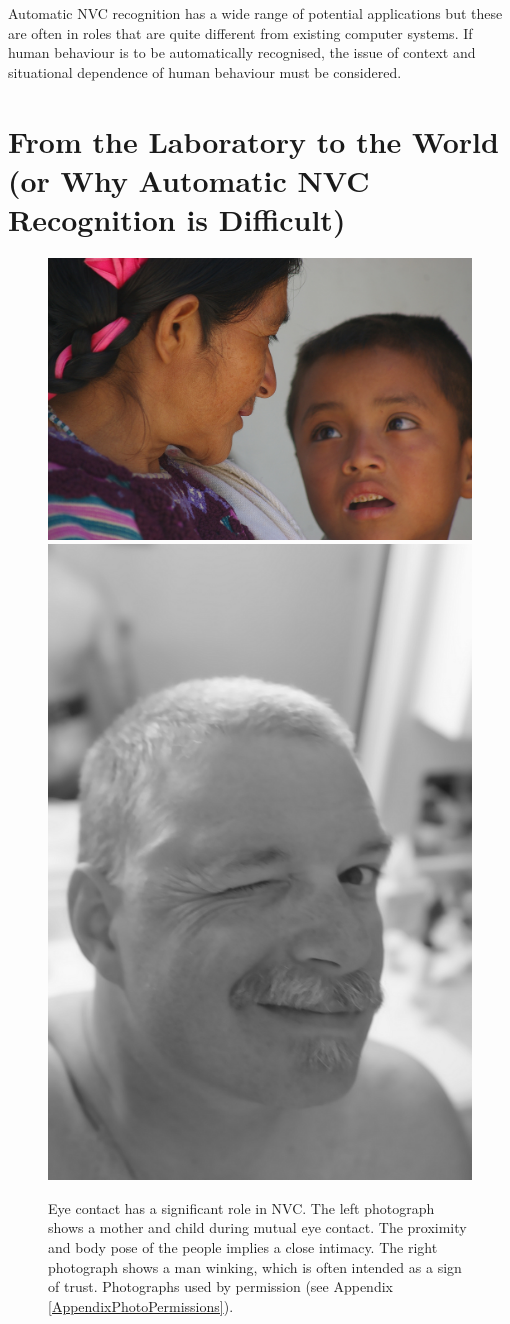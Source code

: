 Automatic \ac{NVC} recognition has a wide range of potential applications but these are often in roles that are quite different from existing computer systems. If human behaviour is to be automatically recognised, the issue of context and situational dependence of human behaviour must be considered.

\section{From the Laboratory to the World (or Why Automatic \ac{NVC} Recognition is Difficult)}
\label{BackgroundWhyIsNvcDifficult}
\label{BackgroundNaturalConvesationContainsRapidHeadMotion}

\begin{figure}[tb]
\centering
\includegraphics[width = 0.59 \columnwidth]{introduction/eyecontact2503079623_0a4aecf3c9_b.jpg}
\includegraphics[width = 0.29 \columnwidth]{introduction/wink3083102723_2180fe13c6_b.jpg}
\caption[Eye contact has a significant role in \ac{NVC}.]{Eye contact has a significant role in \ac{NVC}. The left photograph shows a mother and child during mutual eye contact. The proximity and body pose of the people implies a close intimacy. The right photograph shows a man winking, which is often intended as a sign of trust. Photographs used by permission (see Appendix \ref{AppendixPhotoPermissions}).}
\label{FigureGazeNvc}
\end{figure}

